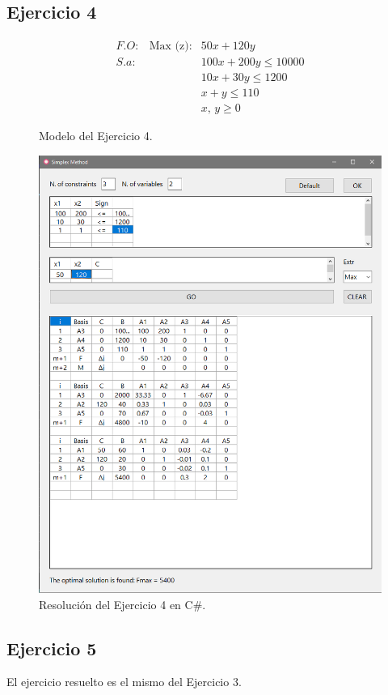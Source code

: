 \documentclass[a4paper, 12pt]{article}
\begin{document}
    \subsection{Ejercicio 4}
    \begin{figure}[H]
        \[\begin{matrix}
            F\!.\!O:&\text{Max (z)}:&50x+120y\\
            S.\!a: &&100x+200y\leq 10000\\
            &&10x+30y\leq 1200\\
            &&x+y\leq 110\\
            &&x,\, y\geq 0
        \end{matrix}\]
        \caption{Modelo del Ejercicio 4.}
    \end{figure}
    \begin{figure}[H]
        \centering
        \includegraphics[width=12cm]{ejercicio4.PNG}
        \caption{Resolución del Ejercicio 4 en C\#.}
    \end{figure}
    \subsection{Ejercicio 5}
    El ejercicio resuelto es el mismo del Ejercicio 3.
\end{document}
